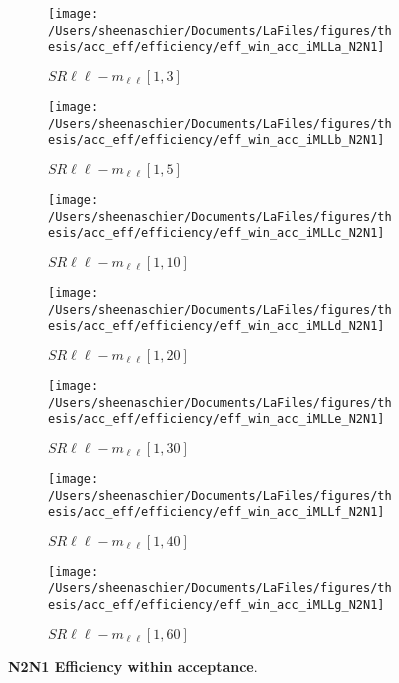 \begin{figure}
        \centering
    \begin{subfigure}[b]{0.44\textwidth}
        \texttt{[image: /Users/sheenaschier/Documents/LaFiles/figures/thesis/acc\_eff/efficiency/eff\_win\_acc\_iMLLa\_N2N1]}
    \caption{$SR\ell\ell-m_{\ell\ell} [1, 3]$}
    \end{subfigure}
    \begin{subfigure}[b]{0.44\textwidth}
        \texttt{[image: /Users/sheenaschier/Documents/LaFiles/figures/thesis/acc\_eff/efficiency/eff\_win\_acc\_iMLLb\_N2N1]}
    \caption{$SR\ell\ell-m_{\ell\ell} [1, 5]$}
    \end{subfigure}
    \begin{subfigure}[b]{0.44\textwidth}
        \texttt{[image: /Users/sheenaschier/Documents/LaFiles/figures/thesis/acc\_eff/efficiency/eff\_win\_acc\_iMLLc\_N2N1]}
    \caption{$SR\ell\ell-m_{\ell\ell} [1, 10]$}
    \end{subfigure}
    \begin{subfigure}[b]{0.44\textwidth}
        \texttt{[image: /Users/sheenaschier/Documents/LaFiles/figures/thesis/acc\_eff/efficiency/eff\_win\_acc\_iMLLd\_N2N1]}
    \caption{$SR\ell\ell-m_{\ell\ell} [1, 20]$}
    \end{subfigure}
    \begin{subfigure}[b]{0.44\textwidth}
        \texttt{[image: /Users/sheenaschier/Documents/LaFiles/figures/thesis/acc\_eff/efficiency/eff\_win\_acc\_iMLLe\_N2N1]}
    \caption{$SR\ell\ell-m_{\ell\ell} [1, 30]$}
    \end{subfigure}
    \begin{subfigure}[b]{0.44\textwidth}
        \texttt{[image: /Users/sheenaschier/Documents/LaFiles/figures/thesis/acc\_eff/efficiency/eff\_win\_acc\_iMLLf\_N2N1]}
    \caption{$SR\ell\ell-m_{\ell\ell} [1, 40]$}
    \end{subfigure}
    \begin{subfigure}[b]{0.44\textwidth}
        \texttt{[image: /Users/sheenaschier/Documents/LaFiles/figures/thesis/acc\_eff/efficiency/eff\_win\_acc\_iMLLg\_N2N1]}
    \caption{$SR\ell\ell-m_{\ell\ell} [1, 60]$}
    \end{subfigure}
    \caption{\textbf{N2N1 Efficiency within acceptance}.}
\end{figure}

